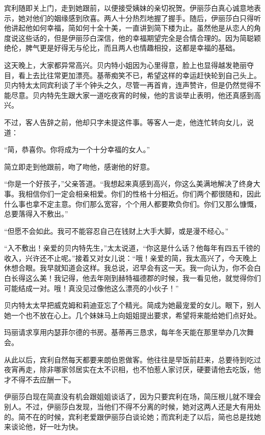 \par 宾利随即关上门，走到她跟前，以便接受姨妹的亲切祝贺。伊丽莎白真心诚意地表示，她对他们的姻缘感到欣喜。两人十分热烈地握了握手。随后，伊丽莎白只得听他讲起他如何幸福，简如何十全十美，一直讲到简下楼为止。虽然他是从恋人的角度说这些话的，但是伊丽莎白深信，他的幸福期望完全是合情合理的。因为简聪颖绝伦，脾气更是好得无与伦比，而且两人也情趣相投，这都是幸福的基础。
\par 这天晚上，大家都异常高兴。贝内特小姐因为心里得意，脸上也显得越发艳丽夺目，看上去比往常更加漂亮。基蒂痴笑不已，希望这样的幸运赶快轮到自己头上。贝内特太太同宾利谈了半个钟头之久，尽管一再首肯，连声赞许，但是仍然觉得不能尽意。贝内特先生跟大家一道吃夜宵的时候，他的言谈举止表明，他还真感到高兴。
\par 不过，客人告辞之前，他却只字未提这件事。等客人一走，他连忙转向女儿，说道：
\par “简，恭喜你。你将成为一个十分幸福的女人。”
\par 简立即走到他跟前，吻了吻他，感谢他的好意。
\par “你是一个好孩子，”父亲答道。“我想起来真感到高兴，你这么美满地解决了终身大事。我相信你们一定会相亲相爱。你们的性格十分相近。你们两个都很随和，因此什么事也拿不定主意。你们那么宽容，个个用人都要欺负你们。你们又那么慷慨，总要落得入不敷出。”
\par “但愿不会如此。我可不能容忍自己在钱财上大手大脚，或是漫不经心。”
\par “入不敷出！亲爱的贝内特先生，”太太说道，“你这是什么话？他每年有四五千镑的收入，兴许还不止呢。”接着又对女儿说：“哦！亲爱的简，我太高兴了，今天晚上休想合眼。我早就知道会这样。我总说，迟早会有这一天。我一向认为，你不会白白长得这么美！我记得，他去年刚到赫特福德郡的时候，我一看见他，就觉得你们可能结成一对。哦！真没见过像他这么漂亮的小伙子！”
\par 贝内特太太早把威克姆和莉迪亚忘了个精光。简成为她最宠爱的女儿。眼下，别人她一个也不放在心上。几个妹妹马上向姐姐提出要求，希望将来能给她们点好处。
\par 玛丽请求享用内瑟菲尔德的书房。基蒂再三恳求，每年冬天能在那里举办几次舞会。
\par 从此以后，宾利自然每天都要来朗伯恩做客。他往往是早饭前赶来，总要待到吃过夜宵再走，除非哪家邻居实在太不识相，也不怕惹人家讨厌，硬要请他去吃饭，他才不得不去应酬一下。
\par 伊丽莎白现在简直没有机会跟姐姐谈话了，因为只要宾利在场，简压根儿就不理会别人。不过，伊丽莎白发现，当他们不得不分离的时候，她对这两人还是大有用处的。简不在的时候，宾利老爱跟伊丽莎白谈论她；而宾利走了以后，简也总是找她来谈论他，好一吐为快。
